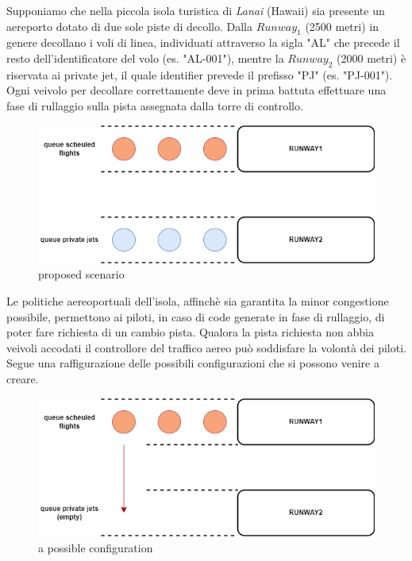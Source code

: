 \documentclass{article}
\begin{document}
\begin{sloppy}
\bigbreak

Supponiamo che nella piccola isola turistica di \textit{Lanai} (Hawaii) sia presente un aereporto dotato di due sole piste di decollo. Dalla \textit{$Runway_1$} (2500 metri) in genere decollano i voli di linea, individuati attraverso la sigla "AL" che precede il resto dell'identificatore del volo (es. "AL-001"), mentre la \textit{$Runway_2$} (2000 metri) è riservata ai private jet, il quale identifier prevede il prefisso "PJ" (es. "PJ-001"). Ogni veivolo per decollare correttamente deve in prima battuta effettuare una fase di rullaggio sulla pista assegnata dalla torre di controllo.

\bigbreak

\begin{figure}
    \centering
    \includegraphics[scale=0.5]{figure1.png}
    \caption{proposed scenario}
    \label{fig:enter-label}
\end{figure}

\bigbreak

Le politiche aereoportuali dell'isola, affinchè sia garantita la minor congestione possibile, permettono ai piloti, in caso di code generate in fase di rullaggio, di poter fare richiesta di un cambio pista. Qualora la pista richiesta non abbia veivoli accodati il controllore del traffico aereo può soddisfare la volontà dei piloti. Segue una raffigurazione delle possibili configurazioni che si possono venire a creare.

\bigbreak

\begin{figure}[H]
    \centering
    \includegraphics[scale=0.5]{figure2.png}
    \caption{a possible configuration}
    \label{fig:enter-label}
\end{figure}



\end{sloppy}
\end{document}
